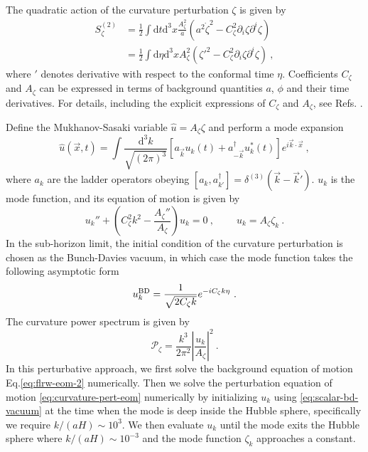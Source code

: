 \documentclass[reprint, 10pt, amsmath, amssymb, floatfix, aps, prd, superscriptaddress, nofootinbib, nobibnotes,twocolumn]{revtex4-1}
\def\dd{{\mathrm{d}}}
\begin{document}
The quadratic action of the curvature perturbation $\zeta$ is given by
\begin{align}
    S_\zeta^{(2)} & = \frac12\int\dd t\dd^3x\frac{A_\zeta^2}{a}\left(a^2\dot\zeta^2 - C_\zeta^2\partial_i\zeta\partial^i\zeta\right)\nonumber\\
    & = \frac12\int\dd\eta\dd^3x A_\zeta^2 \left(\zeta'^2 - C_\zeta^2\partial_i\zeta\partial^i\zeta\right) \ ,
\end{align}
where ${}'$ denotes derivative with respect to the conformal time $\eta$. Coefficients $C_\zeta$ and $A_\zeta$ can be expressed in terms of background quantities $a$, $\phi$ and their time derivatives. For details, including the explicit expressions of $C_\zeta$ and $A_\zeta$, see Refs. \cite{Kawai:2021bye,Kawai:2021edk}.

Define the Mukhanov-Sasaki variable $\hat u = A_\zeta\zeta$ and perform a mode expansion
\begin{equation}\label{eq:u-mode-expansion}
	\hat u(\vec x, t) = \int\frac{\dd^3k}{\sqrt{(2\pi)^3}}\left[a_{\vec k} u_k(t) + a_{-\vec k}^\dagger u_k^\ast(t)\right] e^{i\vec k\cdot\vec x} \ ,
\end{equation}
where $a_k$ are the ladder operators obeying $[a_k, a_{k'}^\dagger] = \delta^{(3)}(\vec k - \vec k')$. $u_k$ is the mode function, and its equation of motion is given by
\begin{equation}\label{eq:curvature-pert-eom}
    u_k'' + \left(C_\zeta^2k^2 - \frac{A_\zeta''}{A_\zeta}\right)u_k = 0 \ , \  \qquad u_k = A_\zeta\zeta_k  \ .
\end{equation}
In the sub-horizon limit, the initial condition of the curvature perturbation is chosen as the Bunch-Davies vacuum, in which case the mode function takes the following asymptotic form
\begin{equation}\label{eq:scalar-bd-vacuum}
	u_k^{\rm BD} = \frac{1}{\sqrt{2C_\zeta k}}e^{-iC_\zeta k\eta} \ .
\end{equation}
The curvature power spectrum is given by
\begin{equation}
	\mathcal P_\zeta = \frac{k^3}{2\pi^2}\left|\frac{u_k}{A_\zeta}\right|^2  \ .
\end{equation}
In this perturbative approach, we first solve the background equation of motion Eq.\eqref{eq:flrw-eom-2} numerically. Then we solve the perturbation equation of motion \eqref{eq:curvature-pert-eom} numerically by initializing $u_k$ using \eqref{eq:scalar-bd-vacuum} at the time when the mode is deep inside the Hubble sphere, specifically we require $k / (aH) \sim 10^3$. We then evaluate $u_k$ until the mode exits the Hubble sphere where $k / (aH) \sim 10^{-3}$ and the mode function $\zeta_k$ approaches a constant.
\end{document}

